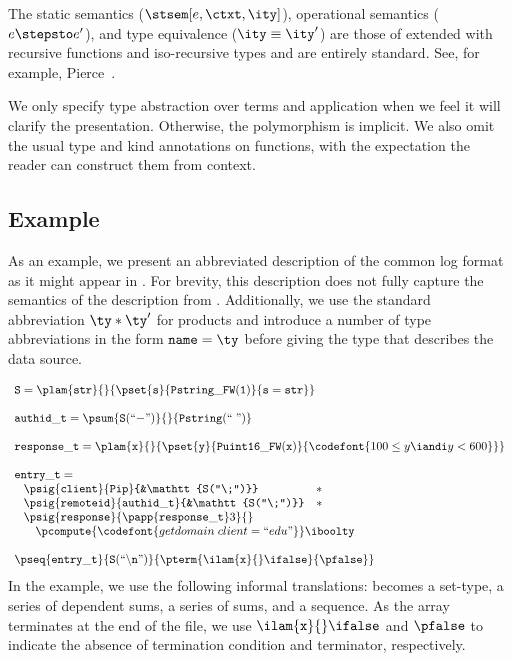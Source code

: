 The static semantics ($\stsem[e,\ctxt,\ity]$), operational
semantics ($e \stepsto e'$), and type 
equivalence ($\ity \equiv \ity'$) are those of \fomega{} extended with
recursive functions and iso-recursive types and are entirely standard.
See, for example, Pierce~\cite{pierce:tapl}.

We only specify type
abstraction over terms and application when we feel it will clarify
the presentation. Otherwise, the polymorphism is implicit.  We also
omit the usual type and kind annotations on functions, with the
expectation the reader can construct them from context.  

\subsection{Example}
\label{sec:ddc-example}

As an example, we present an abbreviated description of the common log
format as it might appear in \ddc{}. For brevity,
this description does not fully capture the semantics of the
\ipads{} description from . Additionally, we
use the standard abbreviation $\ty * \ty'$ for products and introduce a number of type abbreviations
in the form $\mathtt{name} = \ty$ before giving the type that describes the data source.

{\small
\[
\begin{array}{l}
\mathtt{S} = \plam {\mathtt{str}} {} {\pset {\mathtt{s}}
  {\mathtt{Pstring\_FW(1)}} {\mathtt{s = str}}}\\
\\
\mathtt{authid\_t} = 
\psum {\mathtt{S(``{-}")}} {} {\mathtt{Pstring(``\;")}}\\
\\
\mathtt{response\_t} = \plam {\mathtt x} {} {
      \pset {\mathtt y} {\mathtt{Puint16\_FW(x)}} 
      {\codefont{100 \leq y \iandi y < 600}}
    }\\
\\
\mathtt{entry\_t} = \\ \;
\begin{array}{lll}
\psig {\mathtt{client}} {\mathtt{Pip}} {&\mathtt{S(``\;")}} &* \\
\psig {\mathtt{remoteid}} {\mathtt{authid\_t}} {&\mathtt{S(``\;")}} &* \\
\psig {\mathtt{response}} {
  \papp
    {\mathtt{response\_t}} 3
}{} \\
\multicolumn{3}{c}{
\quad \pcompute {\codefont{getdomain\;client = ``edu"}} \iboolty}
\end{array}\\
\\
\pseq {\mathtt{entry\_t}} {\mathtt{S(``\backslash n")}}{
  \pterm {\ilam {\mathtt x} {} \ifalse} {\pfalse}
}
\end{array}
\]}%
\noindent
In the example, we use the following
informal translations: \Pwhere{} becomes a set-type, \Pstruct{} a
series of dependent sums, \Punion{} a series of sums, and
\Parray{} a sequence.  As the array terminates at the end of the file, we
use $\ilam {\mathtt x} {} \ifalse$ and $\pfalse$ to indicate the
absence of termination condition and terminator, respectively.

